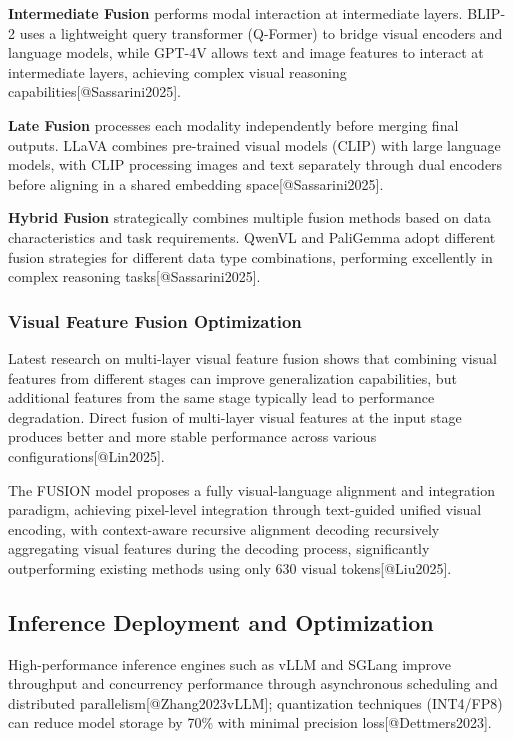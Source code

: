 \documentclass{article}
\begin{document}
\textbf{Intermediate Fusion} performs modal interaction at intermediate layers. BLIP-2 uses a lightweight query transformer (Q-Former) to bridge visual encoders and language models, while GPT-4V allows text and image features to interact at intermediate layers, achieving complex visual reasoning capabilities[@Sassarini2025].

\textbf{Late Fusion} processes each modality independently before merging final outputs. LLaVA combines pre-trained visual models (CLIP) with large language models, with CLIP processing images and text separately through dual encoders before aligning in a shared embedding space[@Sassarini2025].

\textbf{Hybrid Fusion} strategically combines multiple fusion methods based on data characteristics and task requirements. QwenVL and PaliGemma adopt different fusion strategies for different data type combinations, performing excellently in complex reasoning tasks[@Sassarini2025].

\subsubsection{Visual Feature Fusion Optimization}
Latest research on multi-layer visual feature fusion shows that combining visual features from different stages can improve generalization capabilities, but additional features from the same stage typically lead to performance degradation. Direct fusion of multi-layer visual features at the input stage produces better and more stable performance across various configurations[@Lin2025].

The FUSION model proposes a fully visual-language alignment and integration paradigm, achieving pixel-level integration through text-guided unified visual encoding, with context-aware recursive alignment decoding recursively aggregating visual features during the decoding process, significantly outperforming existing methods using only 630 visual tokens[@Liu2025].

\subsection{Inference Deployment and Optimization}
High-performance inference engines such as vLLM and SGLang improve throughput and concurrency performance through asynchronous scheduling and distributed parallelism[@Zhang2023vLLM]; quantization techniques (INT4/FP8) can reduce model storage by 70\% with minimal precision loss[@Dettmers2023].
\end{document}
